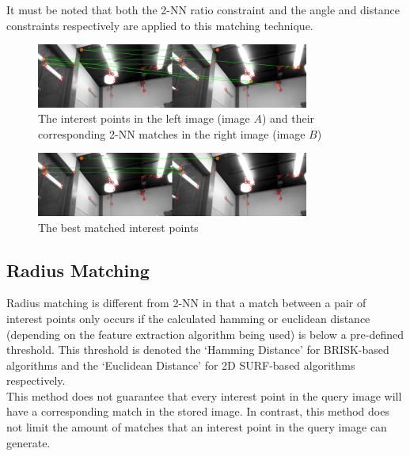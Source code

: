 \documentclass[11pt]{report}
\begin{document}
It must be noted that both the 2-NN ratio constraint and the angle and distance constraints respectively are applied to this matching technique.\\

 \begin{figure}[h!] 
  \centering
    \includegraphics[width=0.8\textwidth]{../Drawings/Matching/feature_matching/dataset1_without_validation_knn.jpg}
    \caption{The interest points in the left image (image $A$) and their corresponding 2-NN matches in the right image (image $B$)}
    \label{fig:2nn_matching}
\end{figure}

 \begin{figure}[h!] 
  \centering
    \includegraphics[width=0.8\textwidth]{../Drawings/Matching/feature_matching/dataset1_without_validation_knn_best.jpg}
    \caption{The best matched interest points}
    \label{fig:2nn_best_match}
\end{figure}

\subsection{Radius Matching}
\label{sec:radius}
Radius matching is different from 2-NN in that a match between a pair of interest points only occurs if the calculated hamming or euclidean distance (depending on the feature extraction algorithm being used) is below a pre-defined threshold. This threshold is denoted the `Hamming Distance' for BRISK-based algorithms and the `Euclidean Distance' for 2D SURF-based algorithms respectively. \\

This method does not guarantee that every interest point in the query image will have a corresponding match in the stored image. In contrast, this method does not limit the amount of matches that an interest point in the query image can generate.\\
\end{document}
